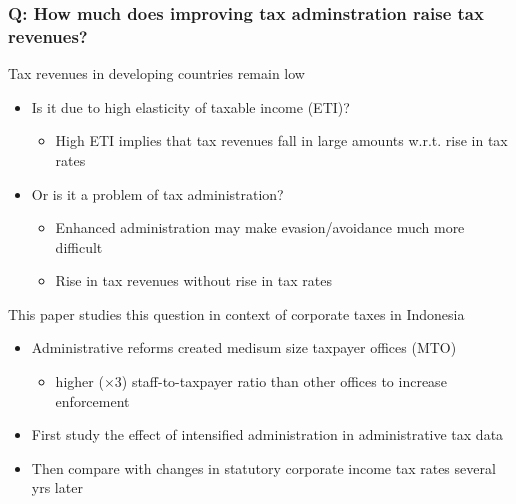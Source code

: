 \documentclass[aspectratio=169]{beamer}
\begin{document}
\begin{frame}
\frametitle{Q: How much does improving tax adminstration raise tax revenues?}
Tax revenues in developing countries remain low
\begin{itemize}\setlength\itemsep{3pt}
\item Is it due to high elasticity of taxable income (ETI)?
\begin{itemize}\setlength\itemsep{3pt}
\item High ETI implies that tax revenues fall in large amounts w.r.t. rise in tax rates
\end{itemize}
\item Or is it a problem of tax administration?
\begin{itemize}\setlength\itemsep{3pt}
\item Enhanced administration may make evasion/avoidance much more difficult
\item Rise in tax revenues without rise in tax rates
\end{itemize}
\end{itemize}\medskip
This paper studies this question in context of corporate taxes in Indonesia
\begin{itemize}\setlength\itemsep{3pt}
\item Administrative reforms created medisum size taxpayer offices (MTO)
\begin{itemize}\setlength\itemsep{3pt}
\item higher ($\times3$) staff-to-taxpayer ratio than other offices to increase enforcement
\end{itemize}
\item First study the effect of intensified administration in administrative tax data
\item Then compare with changes in statutory corporate income tax rates several yrs later
\end{itemize}
\end{frame}
\end{document}
